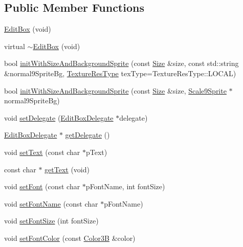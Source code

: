 \subsection*{Public Member Functions}
\begin{DoxyCompactItemize}
\item 
\hyperlink{classui_1_1EditBox_af6c48b01269aeacecf0adcd4936a3f43}{Edit\+Box} (void)
\item 
virtual \hyperlink{classui_1_1EditBox_ad48d2e64d5f6ce57892bc781a973b87a}{$\sim$\+Edit\+Box} (void)
\item 
bool \hyperlink{classui_1_1EditBox_a451ac17204e52de6f3561dfa95110eef}{init\+With\+Size\+And\+Background\+Sprite} (const \hyperlink{classSize}{Size} \&size, const std\+::string \&normal9\+Sprite\+Bg, \hyperlink{classui_1_1Widget_a040a65ec5ad3b11119b7e16b98bd9af0}{Texture\+Res\+Type} tex\+Type=Texture\+Res\+Type\+::\+L\+O\+C\+AL)
\item 
bool \hyperlink{classui_1_1EditBox_a196793a6b697c3033aceee7ec7bd4846}{init\+With\+Size\+And\+Background\+Sprite} (const \hyperlink{classSize}{Size} \&size, \hyperlink{classui_1_1Scale9Sprite}{Scale9\+Sprite} $\ast$normal9\+Sprite\+Bg)
\item 
void \hyperlink{classui_1_1EditBox_a6a6cd93d4204d3415483c4d531646409}{set\+Delegate} (\hyperlink{classui_1_1EditBoxDelegate}{Edit\+Box\+Delegate} $\ast$delegate)
\item 
\hyperlink{classui_1_1EditBoxDelegate}{Edit\+Box\+Delegate} $\ast$ \hyperlink{classui_1_1EditBox_ab4a844e7a6c92162370cf1bba2f60bdb}{get\+Delegate} ()
\item 
void \hyperlink{classui_1_1EditBox_aab808bfc3f2e2ab7553f23b35002dfb7}{set\+Text} (const char $\ast$p\+Text)
\item 
const char $\ast$ \hyperlink{classui_1_1EditBox_ac510a4082911adf52395efab4bd7be83}{get\+Text} (void)
\item 
void \hyperlink{classui_1_1EditBox_a08931a6b6fde6d4e4365204beb3af43d}{set\+Font} (const char $\ast$p\+Font\+Name, int font\+Size)
\item 
void \hyperlink{classui_1_1EditBox_a1070042cf20467ff429d93285a592204}{set\+Font\+Name} (const char $\ast$p\+Font\+Name)
\item 
void \hyperlink{classui_1_1EditBox_a92dda35f7efd5779f63dd70fa7f86686}{set\+Font\+Size} (int font\+Size)
\item 
void \hyperlink{classui_1_1EditBox_a5dd7dcc5252cdb08ef9f0a15238df0dd}{set\+Font\+Color} (const \hyperlink{structColor3B}{Color3B} \&color)
\item 

\end{DoxyCompactItemize}
